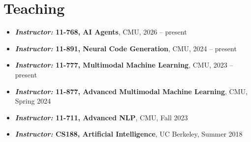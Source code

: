 \section{Teaching}
\begin{itemize}[leftmargin=-0.4mm,partopsep=0pt,label=]
  \item \textbf{\emph{Instructor:} 11-768, AI Agents}, CMU, 2026 -- present
  \item \textbf{\emph{Instructor:} 11-891, Neural Code Generation}, CMU, 2024 -- present
  \item \textbf{\emph{Instructor:} 11-777, Multimodal Machine Learning}, CMU, 2023 -- present
  \item \textbf{\emph{Instructor:} 11-877, Advanced Multimodal Machine Learning}, CMU, Spring 2024
  \item \textbf{\emph{Instructor:} 11-711, Advanced NLP}, CMU, Fall 2023

  \item \textbf{\emph{Instructor:} CS188, Artificial Intelligence}, UC Berkeley, Summer 2018

\end{itemize}
